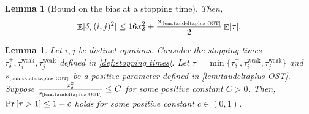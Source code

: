 \documentclass[letterpaper,11pt]{article}
\newtheorem{lemma}[theorem]{Lemma}
\newcommand{\indicator}{\mathbf{1}}
\DeclareMathOperator*{\E}{\mathbb{E}}
\DeclareMathOperator*{\Var}{\mathbf{Var}}
\newcommand{\varianceref}[1]{\variance_{\mbox{\tiny\ref{#1}}}}
\newcommand{\taudeltaplus}{\tau^{+}_\delta}
\newcommand{\variance}{s}
\newcommand{\tauiweak}{\tau^{\mathrm{weak}}_i}
\newcommand{\taujweak}{\tau^{\mathrm{weak}}_j}
\newcommand{\xdelta}{x_{\delta}}
\newcommand{\Cdeltavarplus}{C_{\delta}}
\newcommand{\Cxdelta}{C_{x}}
\newcommand{\Csyncinitial}{C_{\mathrm{s}}}
\begin{document}
\begin{lemma}[Bound on the bias at a stopping time]
    Then, %
    \begin{align*}
    \E[\delta_\tau(i,j)^2]\leq 16\xdelta^2+\frac{\varianceref{lem:taudeltaplus OST}}{2}\E[\tau].
    \end{align*}
\end{lemma}
\begin{lemma}
    \label{lem:taudeltaplus one step sync}
    Let $ i,j $ be distinct opinions.
    Consider the stopping times $\taudeltaplus,\tauiweak,\taujweak$ defined in \cref{def:stopping times}.
    Let $\tau=\min\{\taudeltaplus,\tauiweak,\taujweak\}$
    and $\varianceref{lem:taudeltaplus OST}$ be a positive parameter defined in \cref{lem:taudeltaplus OST}.
    Suppose $\frac{\xdelta^2}{\varianceref{lem:taudeltaplus OST}}\leq C$ for some positive constant $C>0$.
    Then, $\Pr\qty[\tau>1]\leq 1-c$ holds for some positive constant $c\in (0,1)$.
\end{lemma}
\end{document}
